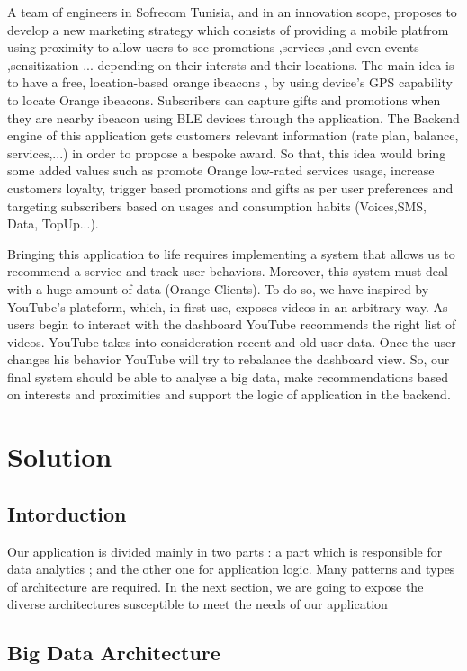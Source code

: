  A team of engineers in Sofrecom Tunisia, and in an innovation scope, proposes to develop a new marketing strategy which consists of 
 providing a mobile platfrom using proximity to allow users to see promotions ,services ,and even events
  ,sensitization ... depending on their intersts and their locations. The main idea is to have a free, location-based
   orange ibeacons , by using device’s GPS capability to locate Orange ibeacons. Subscribers can capture gifts and promotions when they are nearby ibeacon using BLE devices through the application. The Backend engine of this application gets customers relevant information (rate plan, balance, services,...) in order to propose a bespoke award. So that, this idea would bring some added values such as promote Orange low-rated services usage, increase customers loyalty, trigger based promotions and gifts as per user preferences and targeting subscribers based on usages and consumption habits (Voices,SMS, Data, TopUp...).

Bringing this application to life requires implementing a system that allows us to recommend a service and track user behaviors. Moreover, this system must deal with a huge amount of data (Orange Clients). To do so, we have inspired by YouTube’s plateform, which, in ﬁrst use, exposes videos in an arbitrary way. As users begin to interact with the dashboard YouTube recommends the right list of videos. YouTube takes into consideration recent and old user data. Once the user changes his behavior YouTube will try to rebalance the dashboard view. So, our final system should be able to analyse a big data, make recommendations based on interests and proximities and support the logic of application in the backend.
\section{Solution}
\label{subsec:subsec01}

\subsection{Intorduction}
\label{subsec:subsec01}
Our application is divided mainly in two parts : a part which is responsible for data analytics ; 
and the other one for application logic. Many patterns and types of architecture are required.
In the next section, we are going to expose the diverse architectures susceptible to meet the needs of our application
\subsection{Big Data Architecture}
\label{subsec:subsec01}

